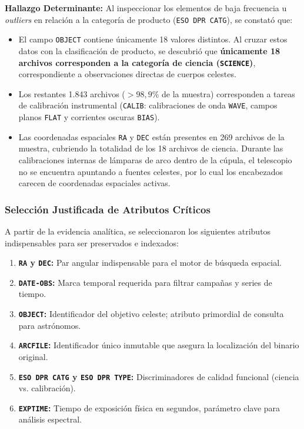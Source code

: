 \documentclass[10pt]{article}
\begin{document}
\textbf{Hallazgo Determinante:} Al inspeccionar los elementos de baja frecuencia u \textit{outliers} en relación a la categoría de producto (\texttt{ESO DPR CATG}), se constató que:
\begin{itemize}
    \item El campo \texttt{OBJECT} contiene únicamente 18 valores distintos. Al cruzar estos datos con la clasificación de producto, se descubrió que \textbf{únicamente 18 archivos corresponden a la categoría de ciencia (\texttt{SCIENCE})}, correspondiente a observaciones directas de cuerpos celestes.
    \item Los restantes 1.843 archivos ($>98,9\%$ de la muestra) corresponden a tareas de calibración instrumental (\texttt{CALIB}: calibraciones de onda \texttt{WAVE}, campos planos \texttt{FLAT} y corrientes oscuras \texttt{BIAS}).
    \item Las coordenadas espaciales \texttt{RA} y \texttt{DEC} están presentes en 269 archivos de la muestra, cubriendo la totalidad de los 18 archivos de ciencia. Durante las calibraciones internas de lámparas de arco dentro de la cúpula, el telescopio no se encuentra apuntando a fuentes celestes, por lo cual los encabezados carecen de coordenadas espaciales activas.
\end{itemize}

\subsubsection{Selección Justificada de Atributos Críticos}
A partir de la evidencia analítica, se seleccionaron los siguientes atributos indispensables para ser preservados e indexados:
\begin{enumerate}
    \item \textbf{\texttt{RA} y \texttt{DEC}:} Par angular indispensable para el motor de búsqueda espacial.
    \item \textbf{\texttt{DATE-OBS}:} Marca temporal requerida para filtrar campañas y series de tiempo.
    \item \textbf{\texttt{OBJECT}:} Identificador del objetivo celeste; atributo primordial de consulta para astrónomos.
    \item \textbf{\texttt{ARCFILE}:} Identificador único inmutable que asegura la localización del binario original.
    \item \textbf{\texttt{ESO DPR CATG} y \texttt{ESO DPR TYPE}:} Discriminadores de calidad funcional (ciencia vs. calibración).
    \item \textbf{\texttt{EXPTIME}:} Tiempo de exposición física en segundos, parámetro clave para análisis espectral.
\end{enumerate}
\end{document}
